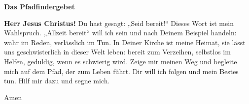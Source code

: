 
\newpage
\vspace*{\fill}
\begin{center}
\begin{minipage}{.8\textwidth}

    \begin{center}
        \textbf{\LARGE{Das Pfadfindergebet} }
        \vspace{.5cm}
    \end{center}

    \begingroup\obeylines\Large
    \textbf{Herr Jesus Christus!}
        Du hast gesagt: „Seid bereit!“
        Dieses Wort ist mein Wahlspruch.
        \bigskip
        „Allzeit bereit“ will ich sein
        und nach Deinem Beispiel handeln:
        wahr im Reden,
        verlässlich im Tun.
        \bigskip
        In Deiner Kirche ist meine Heimat,
        sie lässt uns geschwisterlich
        in dieser Welt leben:
        bereit zum Verzeihen,
        selbstlos im Helfen,
        geduldig, wenn es schwierig wird.
        \bigskip
        Zeige mir meinen Weg
        und begleite mich auf dem Pfad,
        der zum Leben führt.
        \bigskip
        Dir will ich folgen und mein Bestes tun.
        Hilf mir dazu und segne mich.
        \begin{flushright}Amen\end{flushright}
    \endgroup
    \vspace{2cm}
\end{minipage}
\end{center}
\vfill %
\newpage